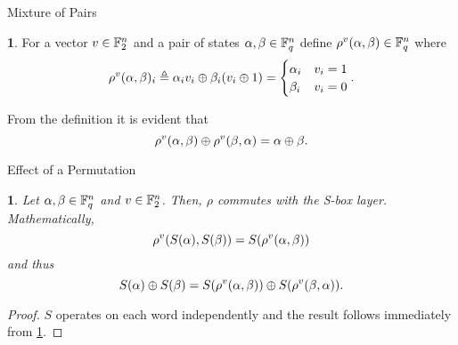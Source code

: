 \documentclass[notheorems]{beamer}
\newtheorem{lemma}{\translate{Lemma}}
\theoremstyle{definition}
\newtheorem{definition}{\translate{Definition}}
\theoremstyle{example}
\begin{document}
    \begin{frame}{Mixture of Pairs}
        \begin{definition}
            \label{def:rho-v}
            For a vector \(v \in \mathbb F_2^n\) and a pair of states \(\alpha, \beta
            \in \mathbb F_q^n\) define \(\rho^v(\alpha, \beta) \in \mathbb F_q^n\)
            where
            \begin{equation}
                \rho^v(\alpha, \beta)_i \triangleq \alpha_iv_i \oplus \beta_i(v_i \oplus 1) =
                \begin{cases}
                    \alpha_i & v_i = 1 \\
                    \beta_i & v_i = 0
                \end{cases}.
                \label{eq:rho-v-def}
            \end{equation}
        \end{definition}
        \pause
        From the definition it is evident that
        \begin{equation}
            \rho^v(\alpha, \beta) \oplus \rho^v(\beta, \alpha) = \alpha \oplus \beta.
            \label{eq:rho-xor}
        \end{equation}
    \end{frame}

    \begin{frame}{Effect of a Permutation}
        \begin{lemma}
            \label{lem:rho-perm}
            Let \(\alpha, \beta \in \mathbb F_q^n\) and \(v \in \mathbb F_2^n\). Then,
            \(\rho\) commutes with the S-box layer. Mathematically,
            \begin{equation}
                \rho^v(S(\alpha), S(\beta)) = S(\rho^v(\alpha, \beta))
                \label{eq:rho-s-invariant}
            \end{equation}
            and thus
            \begin{equation}
                S(\alpha) \oplus S(\beta) = S(\rho^v(\alpha, \beta)) \oplus S(\rho^v(\beta, \alpha)).
            \end{equation}
        \end{lemma}
        \pause
        \begin{proof}
            \(S\) operates on each word independently and the result follows
            immediately from \cref{def:rho-v}.
        \end{proof}
    \end{frame}
\end{document}
